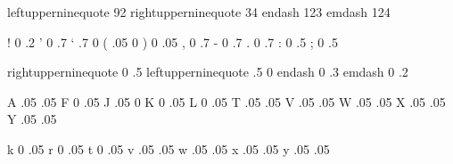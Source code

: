 

\unprotect 

 leftupperninequote   92 
 rightupperninequote  34 
 endash              123
 emdash              124

\startfonthandling[defpunc]

   !  0  .2
   '  0  .7
   ` .7   0
   ( .05  0   
   )  0  .05
   ,  0  .7
   -  0  .7
   .  0  .7
   :  0  .5
   ;  0  .5

   rightupperninequote  0 .5
   leftupperninequote  .5  0 
   endash               0 .3  
   emdash               0 .2  

\stopfonthandling

\startfonthandling[defalph]

   A .05 .05
   F  0  .05
   J .05   0
   K  0  .05 
   L  0  .05
   T .05 .05
   V .05 .05
   W .05 .05
   X .05 .05
   Y .05 .05
  
   k  0  .05 
   r  0  .05
   t  0  .05 
   v .05 .05
   w .05 .05
   x .05 .05
   y .05 .05
 
\stopfonthandling


\protect \endinput 
